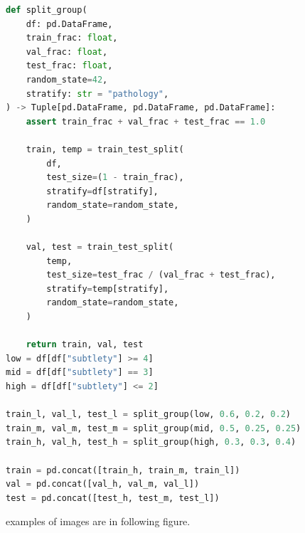 \documentclass[11pt,a4paper]{article}
\begin{document}
\begin{lstlisting}[language=Python, caption=Train-val-test split based on subtlety provided inside the dataset]
def split_group(
    df: pd.DataFrame,
    train_frac: float,
    val_frac: float,
    test_frac: float,
    random_state=42,
    stratify: str = "pathology",
) -> Tuple[pd.DataFrame, pd.DataFrame, pd.DataFrame]:
    assert train_frac + val_frac + test_frac == 1.0

    train, temp = train_test_split(
        df,
        test_size=(1 - train_frac),
        stratify=df[stratify],
        random_state=random_state,
    )

    val, test = train_test_split(
        temp,
        test_size=test_frac / (val_frac + test_frac),
        stratify=temp[stratify],
        random_state=random_state,
    )

    return train, val, test
low = df[df["subtlety"] >= 4]
mid = df[df["subtlety"] == 3]
high = df[df["subtlety"] <= 2]

train_l, val_l, test_l = split_group(low, 0.6, 0.2, 0.2)
train_m, val_m, test_m = split_group(mid, 0.5, 0.25, 0.25)
train_h, val_h, test_h = split_group(high, 0.3, 0.3, 0.4)

train = pd.concat([train_h, train_m, train_l])
val = pd.concat([val_h, val_m, val_l])
test = pd.concat([test_h, test_m, test_l])
\end{lstlisting}

examples of images are in following figure.
\end{document}
